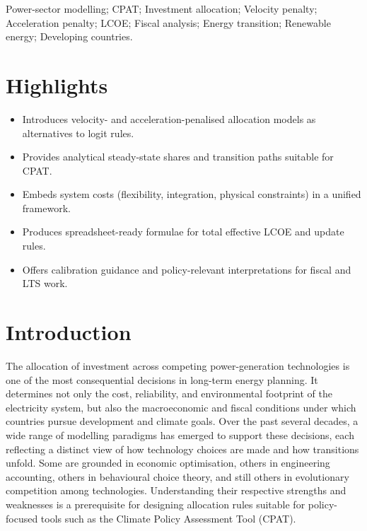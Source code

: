 \documentclass[preprint,authoryear,12pt]{elsarticle}
\begin{document}
\begin{frontmatter}

\begin{keyword}
Power-sector modelling; CPAT; Investment allocation; Velocity penalty; Acceleration penalty; LCOE; Fiscal analysis; Energy transition; Renewable energy; Developing countries.
\end{keyword}

\end{frontmatter}


\newpage
\section*{Highlights}
\begin{itemize}
    \item Introduces velocity- and acceleration-penalised allocation models as alternatives to logit rules.
    \item Provides analytical steady-state shares and transition paths suitable for CPAT.
    \item Embeds system costs (flexibility, integration, physical constraints) in a unified framework.
    \item Produces spreadsheet-ready formulae for total effective LCOE and update rules.
    \item Offers calibration guidance and policy-relevant interpretations for fiscal and LTS work.
\end{itemize}
\clearpage
\tableofcontents
\thispagestyle{empty}
\clearpage


\section{Introduction}

The allocation of investment across competing power-generation technologies is one of the most
consequential decisions in long-term energy planning. It determines not only the cost,
reliability, and environmental footprint of the electricity system, but also the macroeconomic and
fiscal conditions under which countries pursue development and climate goals. Over the past
several decades, a wide range of modelling paradigms has emerged to support these decisions,
each reflecting a distinct view of how technology choices are made and how transitions unfold.
Some are grounded in economic optimisation, others in engineering accounting, others in
behavioural choice theory, and still others in evolutionary competition among technologies.
Understanding their respective strengths and weaknesses is a prerequisite for designing
allocation rules suitable for policy-focused tools such as the Climate Policy Assessment Tool
(\textsc{CPAT}).
\end{document}
